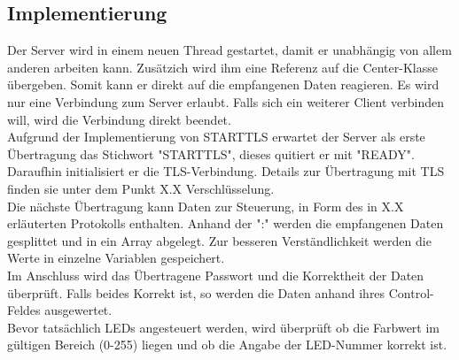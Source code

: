 \subsection{Implementierung}
Der Server wird in einem neuen Thread gestartet, damit er unabhängig von allem anderen arbeiten kann. Zusätzich wird ihm eine Referenz auf die Center-Klasse übergeben. Somit kann er direkt auf die empfangenen Daten reagieren. Es wird nur eine Verbindung zum Server erlaubt. Falls sich ein weiterer Client verbinden will, wird die Verbindung direkt beendet.\\
Aufgrund der Implementierung von STARTTLS erwartet der Server als erste Übertragung das Stichwort "STARTTLS", dieses quitiert er mit "READY". Daraufhin initialisiert er die TLS-Verbindung. Details zur Übertragung mit TLS finden sie unter dem Punkt X.X Verschlüsselung. \\
Die nächste Übertragung kann Daten zur Steuerung, in Form des in X.X erläuterten Protokolls enthalten. Anhand der ":" werden die empfangenen Daten gesplittet und in ein Array abgelegt. Zur besseren Verständlichkeit werden die Werte in einzelne Variablen gespeichert. \\
Im Anschluss wird das Übertragene Passwort und die Korrektheit der Daten überprüft. Falls beides Korrekt ist, so werden die Daten anhand ihres Control-Feldes ausgewertet. \\
Bevor tatsächlich LEDs angesteuert werden, wird überprüft ob die Farbwert im gültigen Bereich (0-255) liegen und ob die Angabe der LED-Nummer korrekt ist.\\
	
